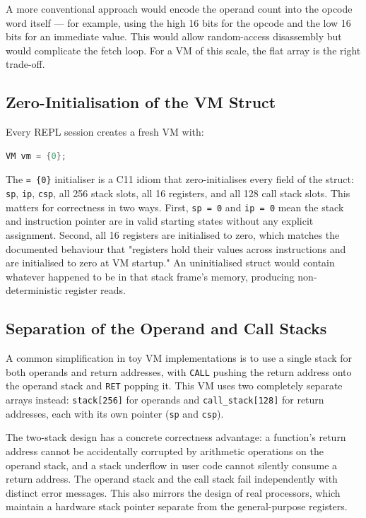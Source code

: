 A more conventional approach would encode the operand count into the opcode word itself — for example, using the high 16 bits for the opcode and the low 16 bits for an immediate value. This would allow random-access disassembly but would complicate the fetch loop. For a VM of this scale, the flat array is the right trade-off.

\subsection{Zero-Initialisation of the VM Struct}

Every REPL session creates a fresh VM with:

\begin{lstlisting}[language=C]
VM vm = {0};
\end{lstlisting}

The \texttt{= \{0\}} initialiser is a C11 idiom that zero-initialises every field of the struct: \texttt{sp}, \texttt{ip}, \texttt{csp}, all 256 stack slots, all 16 registers, and all 128 call stack slots. This matters for correctness in two ways. First, \texttt{sp = 0} and \texttt{ip = 0} mean the stack and instruction pointer are in valid starting states without any explicit assignment. Second, all 16 registers are initialised to zero, which matches the documented behaviour that "registers hold their values across instructions and are initialised to zero at VM startup." An uninitialised struct would contain whatever happened to be in that stack frame's memory, producing non-deterministic register reads.

\subsection{Separation of the Operand and Call Stacks}

A common simplification in toy VM implementations is to use a single stack for both operands and return addresses, with \texttt{CALL} pushing the return address onto the operand stack and \texttt{RET} popping it. This VM uses two completely separate arrays instead: \texttt{stack[256]} for operands and \texttt{call\_stack[128]} for return addresses, each with its own pointer (\texttt{sp} and \texttt{csp}).

The two-stack design has a concrete correctness advantage: a function's return address cannot be accidentally corrupted by arithmetic operations on the operand stack, and a stack underflow in user code cannot silently consume a return address. The operand stack and the call stack fail independently with distinct error messages. This also mirrors the design of real processors, which maintain a hardware stack pointer separate from the general-purpose registers.

